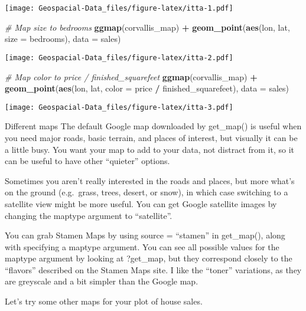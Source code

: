 \documentclass[]{article}
\newenvironment{Shaded}{\begin{snugshade}}{\end{snugshade}}
\newcommand{\CommentTok}[1]{\textcolor[rgb]{0.56,0.35,0.01}{\textit{#1}}}
\newcommand{\DataTypeTok}[1]{\textcolor[rgb]{0.13,0.29,0.53}{#1}}
\newcommand{\KeywordTok}[1]{\textcolor[rgb]{0.13,0.29,0.53}{\textbf{#1}}}
\newcommand{\NormalTok}[1]{#1}
\newcommand{\OperatorTok}[1]{\textcolor[rgb]{0.81,0.36,0.00}{\textbf{#1}}}
\newcommand{\StringTok}[1]{\textcolor[rgb]{0.31,0.60,0.02}{#1}}
\begin{document}
\texttt{[image: Geospacial-Data\_files/figure-latex/itta-1.pdf]}

\begin{Shaded}
\begin{Highlighting}[]
\CommentTok{# Map size to bedrooms}
\KeywordTok{ggmap}\NormalTok{(corvallis_map) }\OperatorTok{+}
\StringTok{    }\KeywordTok{geom_point}\NormalTok{(}\KeywordTok{aes}\NormalTok{(lon, lat, }\DataTypeTok{size =}\NormalTok{ bedrooms), }\DataTypeTok{data =}\NormalTok{ sales)}
\end{Highlighting}
\end{Shaded}

\texttt{[image: Geospacial-Data\_files/figure-latex/itta-2.pdf]}

\begin{Shaded}
\begin{Highlighting}[]
\CommentTok{# Map color to price / finished_squarefeet}
\KeywordTok{ggmap}\NormalTok{(corvallis_map) }\OperatorTok{+}
\StringTok{    }\KeywordTok{geom_point}\NormalTok{(}\KeywordTok{aes}\NormalTok{(lon, lat, }\DataTypeTok{color =}\NormalTok{ price }\OperatorTok{/}\StringTok{ }\NormalTok{finished_squarefeet), }\DataTypeTok{data =}\NormalTok{ sales)}
\end{Highlighting}
\end{Shaded}

\texttt{[image: Geospacial-Data\_files/figure-latex/itta-3.pdf]}

Different maps The default Google map downloaded by get\_map() is useful
when you need major roads, basic terrain, and places of interest, but
visually it can be a little busy. You want your map to add to your data,
not distract from it, so it can be useful to have other ``quieter''
options.

Sometimes you aren't really interested in the roads and places, but more
what's on the ground (e.g.~grass, trees, desert, or snow), in which case
switching to a satellite view might be more useful. You can get Google
satellite images by changing the maptype argument to ``satellite''.

You can grab Stamen Maps by using source = ``stamen'' in get\_map(),
along with specifying a maptype argument. You can see all possible
values for the maptype argument by looking at ?get\_map, but they
correspond closely to the ``flavors'' described on the Stamen Maps site.
I like the ``toner'' variations, as they are greyscale and a bit simpler
than the Google map.

Let's try some other maps for your plot of house sales.
\end{document}
